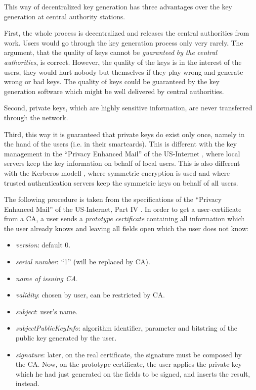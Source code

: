 This way of decentralized key generation has three advantages over the
key generation at central authority stations.

First, the whole process is decentralized and releases
the central authorities from work. Users would go through
the key generation process only very rarely.
The argument, that the quality of keys cannot be {\em guaranteed
by the central authorities}, is correct.
However, the quality of the keys is in the interest of the users,
they would hurt nobody but themselves if they play wrong
and generate wrong or bad keys.
The quality of keys could be guaranteed by the key generation
software which might be well delivered by central authorities.

Second, private keys, which are highly sensitive information,
are never transferred through the network.

Third, this way it is guaranteed that private keys do exist only once,
namely in the hand of the users (i.e. in their smartcards).
This is different with the key management in the
``Privacy Enhanced Mail'' of the US-Internet \cite{rfc1},
where local servers keep the key information on behalf of
local users.
This is also different with the
Kerberos modell \cite{ste1},
where symmetric encryption is used
and where trusted authentication servers keep the symmetric keys
on behalf of all users.

The following procedure is taken from the
specifications of the ``Privacy Enhanced Mail''
of the US-Internet, Part IV \cite{rfc1}.
In order to get a user-certificate from a CA,
a user sends a {\em prototype certificate}
containing all information which the user already knows
and leaving all fields open which the user does not know:

\begin{itemize}
\item
{\em version}: default 0.
\item
{\em serial number}: ``1'' (will be replaced by CA).
\item
{\em name of issuing CA}.
\item
{\em validity}: chosen by user, can be restricted by CA.
\item
{\em subject}: user's name.
\item
{\em subjectPublicKeyInfo}: algorithm identifier, parameter and
bitstring of the public key generated by the user.
\item
{\em signature}: later, on the real certificate,
the signature must be composed by the CA.
Now, on the prototype certificate,
the user applies the private key which he had just generated
on the fields to be signed, and inserts the result, instead.
\end{itemize}

